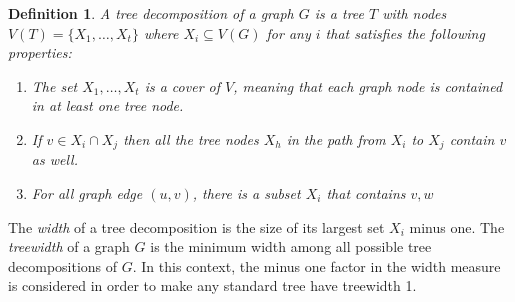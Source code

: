 \documentclass[12pt,a4paper]{article}
\newtheorem{definition}{Definition}
\begin{document}
    \begin{definition}
      A tree decomposition of a graph $G$ is a tree $T$ with nodes $V(T) = \{X_1, \ldots, X_t\}$ where $X_i \subseteq V(G)$ for any $i$ that satisfies the following properties:
      \begin{enumerate}
        \item The set $X_1, \ldots, X_t$ is a cover of $V$, meaning that each graph node is contained in at least one tree node.
        \item If $v \in X_i \cap X_j$ then all the tree nodes $X_h$ in the path from $X_i$ to $X_j$ contain $v$ as well.
        \item For all graph edge $(u,v)$, there is a subset $X_i$ that contains $v,w$
      \end{enumerate}
    \end{definition}

    The \textit{width} of a tree decomposition is the size of its largest set $X_i$ minus one. The \textit{treewidth} of a graph $G$ is the minimum width among all possible tree decompositions of $G$. In this context, the minus one factor in the width measure is considered in order to make any standard tree have treewidth 1.
\end{document}
